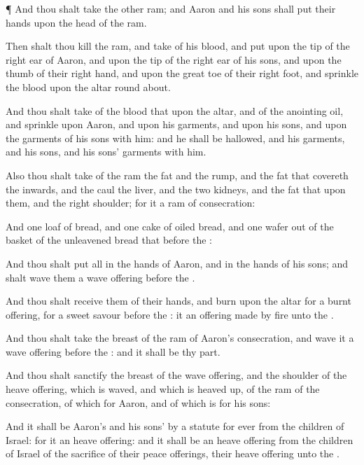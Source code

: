 {\par }{\PP {}¶ And thou shalt
take the
other
ram; and
Aaron and his
sons shall
put their
hands upon the
head of the
ram.

Then shalt thou
kill the
ram, and
take of his
blood, and
put
{} upon the
tip of the right
ear of
Aaron, and upon the
tip of the
right
ear of his
sons, and upon the
thumb of their
right
hand, and upon the great
toe of their
right
foot, and
sprinkle the
blood upon the
altar round
about.

And thou shalt
take of the
blood that
{} upon the
altar, and of the
anointing
oil, and
sprinkle
{} upon
Aaron, and upon his
garments, and upon his
sons, and upon the
garments of his
sons with him: and he shall be
hallowed, and his
garments, and his
sons, and his
sons’
garments with him.

Also thou shalt
take of the
ram the
fat and the
rump, and the
fat that
covereth the
inwards, and the
caul
{} the
liver, and the
two
kidneys, and the
fat that
{} upon them, and the
right
shoulder; for it
{} a
ram of
consecration:

And
one
loaf of
bread, and
one
cake of
oiled bread, and
one
wafer out of the
basket of the unleavened
bread that
{}
before the
{}:

And thou shalt
put all in the
hands of
Aaron, and in the
hands of his
sons; and shalt
wave them
{} a wave
offering
before the
{}.

And thou shalt
receive them of their
hands, and
burn
{} upon the
altar for a burnt
offering, for a
sweet
savour
before the
{}: it
{} an offering made by
fire unto the
{}.

And thou shalt
take the
breast of the
ram of
Aaron’s
consecration, and
wave it
{} a wave
offering
before the
{}: and it shall be thy
part.

And thou shalt
sanctify the
breast of the wave
offering, and the
shoulder of the heave
offering, which is
waved, and which is heaved
up, of the
ram of the
consecration,
{} of
{}
which
{} for
Aaron, and of
{} which is for his
sons:

And it shall be
Aaron’s and his
sons’ by a
statute for
ever from the
children of
Israel: for it
{} an heave
offering: and it shall be an heave
offering from the
children of
Israel of the
sacrifice of their peace
offerings,
{} their heave
offering unto the
{}.


}
